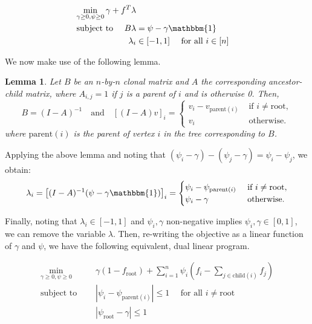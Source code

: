 \documentclass[11pt]{article}
\newtheorem{lemma}{Lemma}
\begin{document}
\begin{mdframed}
  \begin{align}
    \min_{\gamma \geq 0, \psi \geq 0} \gamma + f^T\lambda \\
    \text{subject to } \quad 
    B\lambda &= \psi - \gamma\mathbbm{1} \label{eq:dualconstr0} \\
    \lambda_i &\in [-1, 1] \quad\text{ for all } i \in [n]
  \end{align}
\end{mdframed}

We now make use of the following lemma.

\begin{lemma}
  \label{thm:main}
  Let $B$ be an $n$-by-$n$ clonal matrix and $A$ the corresponding ancestor-child matrix,
  where $A_{i,j} = 1$ if $j$ is a parent of $i$ and is otherwise 0. Then, 
  $$B = (I - A)^{-1} \quad\text{and}\quad [(I - A)v]_i = \begin{cases}
    v_i - v_{\text{parent}(i)} &\text{ if } i \neq \text{root}, \\
    v_i &\text{ otherwise}.
  \end{cases}$$
  where $\text{parent}(i)$ is the parent of vertex $i$ in the tree corresponding to $B$.
\end{lemma}

Applying the above lemma and noting that $(\psi_i -\gamma) - (\psi_j - \gamma) = \psi_i - \psi_j$,
we obtain:
$$\lambda_i = \left[(I - A)^{-1}(\psi - \gamma\mathbbm{1})\right]_i = \begin{cases}
  \psi_i - \psi_{\text{parent}(i)} &\text{ if } i \neq \text{root}, \\
  \psi_i - \gamma &\text{ otherwise}.
\end{cases}
$$

Finally, noting that $\lambda_i \in [-1, 1]$ and $\psi_i, \gamma$ non-negative implies
$\psi_i, \gamma \in [0, 1]$, we can remove the variable $\lambda$. Then,
re-writing the objective as a linear function of $\gamma$ and $\psi$, we have 
the following equivalent, dual linear program.

\begin{mdframed}
  \begin{align}
    \min_{\gamma \geq 0, \psi \geq 0} \qquad&\gamma(1-f_{\text{root}}) + \sum_{i=1}^n \psi_i\left(f_i - \sum_{j \in \text{child}(i)} f_j\right) \\
    \text{subject to } \quad &|\psi_i - \psi_{\text{parent}(i)}| \leq 1 \quad\text{ for all } i \neq \text{root} \label{eq:dualconstr0} \\
                             &|\psi_{\text{root}} - \gamma| \leq 1
  \end{align}
\end{mdframed}
\end{document}
